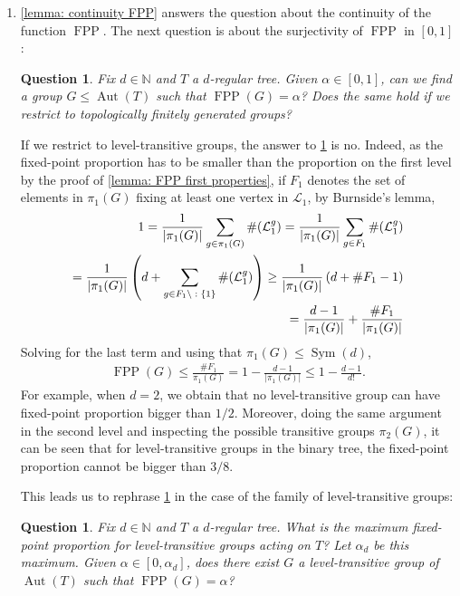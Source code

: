 \documentclass{amsart}
\def\set#1{{\def\st{\;:\;}\left\{#1\right\}}}
\def\abs#1{\left\vert{#1}\right\vert}
\def\NN{\mathbb N}
\DeclareMathOperator{\Aut}{Aut}
\DeclareMathOperator{\FPP}{FPP}
\DeclareMathOperator{\Sym}{Sym}
\DeclareMathOperator{\st}{st}
\newtheorem{Question}[Proposition]{Question}
\begin{document}
\begin{enumerate}
\item \cref{lemma: continuity FPP} answers the question about the continuity of the function $\FPP$. The next question is about the surjectivity of $\FPP$ in $[0,1]$:

\begin{Question}
Fix $d \in \NN$ and $T$ a $d$-regular tree. Given $\alpha \in [0,1]$, can we find a group $G \leq \Aut(T)$ such that $\FPP(G) = \alpha$? Does the same hold if we restrict to topologically finitely generated groups?
\label{question: FPP surjective}
\end{Question}

If we restrict to level-transitive groups, the answer to \cref{question: FPP surjective} is no. Indeed, as the fixed-point proportion has to be smaller than the proportion on the first level by the proof of \cref{lemma: FPP first properties}, if $F_1$ denotes the set of elements in $\pi_1(G)$ fixing at least one vertex in $\mathcal{L}_1$, by Burnside's lemma,
\begin{align*}
1 = \frac{1}{\abs{\pi_1(G)}} \sum_{g \in \pi_1(G)} \# (\mathcal{L}_1^g) = \frac{1}{\abs{\pi_1(G)}} \sum_{g \in F_1} \# (\mathcal{L}_1^g) \\ = \frac{1}{\abs{\pi_1(G)}} \left(d + \sum_{g \in F_1 \setminus \set{1}} \# (\mathcal{L}_1^g) \right) \geq \frac{1}{\abs{\pi_1(G)}} \left(d + \# F_1 -1 \right) \\ = \frac{d-1}{\abs{\pi_1(G)}} + \frac{\# F_1}{\abs{\pi_1(G)}} 
\end{align*}
Solving for the last term and using that $\pi_1(G) \leq \Sym(d)$,
\begin{align*}
\FPP(G) \leq \frac{\# F_1}{\pi_1(G)} = 1 - \frac{d-1}{\abs{\pi_1(G)}} \leq 1 - \frac{d-1}{d!}.
\end{align*}
For example, when $d = 2$, we obtain that no level-transitive group can have fixed-point proportion bigger than $1/2$. Moreover, doing the same argument in the second level and inspecting the possible transitive groups $\pi_2(G)$, it can be seen that for level-transitive groups in the binary tree, the fixed-point proportion cannot be bigger than $3/8$.

This leads us to rephrase \cref{question: FPP surjective} in the case of the family of level-transitive groups:

\begin{Question}
Fix $d \in \NN$ and $T$ a $d$-regular tree. What is the maximum fixed-point proportion for level-transitive groups acting on $T$? Let $\alpha_d$ be this maximum. Given $\alpha \in [0,\alpha_d]$, does there exist $G$ a level-transitive group of $\Aut(T)$ such that $\FPP(G) = \alpha$? 
\end{Question}



\end{enumerate}
\end{document}
